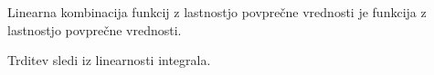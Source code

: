 \documentclass[mat1]{fmfdelo}
\begin{document}
    \begin{trditev}
        \label{linlpv}
        Linearna kombinacija funkcij z lastnostjo povprečne vrednosti je funkcija z lastnostjo povprečne vrednosti. 
    \end{trditev}
    \begin{dokaz}
        Trditev sledi iz linearnosti integrala.
    \end{dokaz}

\end{document}
